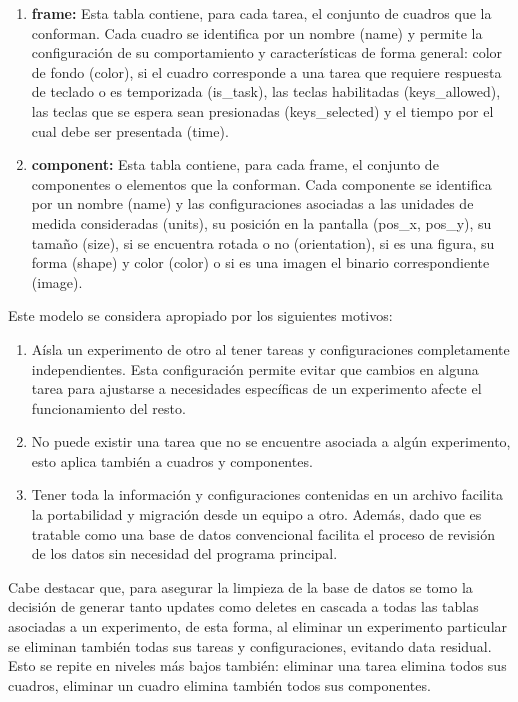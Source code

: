 \documentclass[\main/main.tex]{subfiles}
\begin{document}
\begin{enumerate}
			\item \textbf{frame:} Esta tabla contiene, para cada tarea, el conjunto de cuadros que la conforman. Cada cuadro se identifica por un nombre (name) y permite la configuración de su comportamiento y características de forma general: color de fondo (color), si el cuadro corresponde a una tarea que requiere respuesta de teclado o es temporizada (is\_task), las teclas habilitadas (keys\_allowed), las teclas que se espera sean presionadas (keys\_selected) y el tiempo por el cual debe ser presentada (time).

			\item \textbf{component:} Esta tabla contiene, para cada frame, el conjunto de componentes o elementos que la conforman. Cada componente se identifica por un nombre (name) y las configuraciones asociadas a las unidades de medida consideradas (units), su posición en la pantalla (pos\_x, pos\_y), su tamaño (size), si se encuentra rotada o no (orientation), si es una figura, su forma (shape) y color (color) o si es una imagen el binario correspondiente (image). 
		\end{enumerate}

		Este modelo se considera apropiado por los siguientes motivos:
		\begin{enumerate}
			\item Aísla un experimento de otro al tener tareas y configuraciones completamente independientes. Esta configuración permite evitar que cambios en alguna tarea para ajustarse a necesidades específicas de un experimento afecte el funcionamiento del resto.

			\item No puede existir una tarea que no se encuentre asociada a algún experimento, esto aplica también a cuadros y componentes. 

			\item Tener toda la información y configuraciones contenidas en un archivo facilita la portabilidad y migración desde un equipo a otro. Además, dado que es tratable como una base de datos convencional facilita el proceso de revisión de los datos sin necesidad del programa principal.
		\end{enumerate}

		Cabe destacar que, para asegurar la limpieza de la base de datos se tomo la decisión de generar tanto updates como deletes en cascada a todas las tablas asociadas a un experimento, de esta forma, al eliminar un experimento particular se eliminan también todas sus tareas y configuraciones, evitando data residual. Esto se repite en niveles más bajos también: eliminar una tarea elimina todos sus cuadros, eliminar un cuadro elimina también todos sus componentes.  
\end{document}
